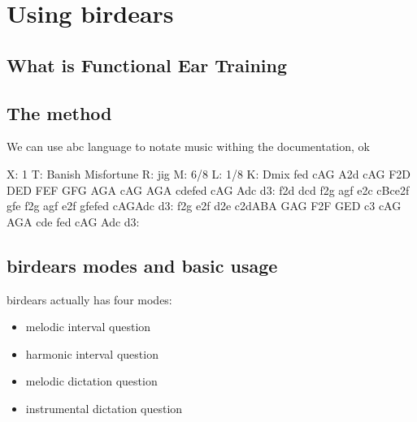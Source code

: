 \documentclass[letterpaper,10pt,english]{sphinxmanual}
\begin{document}
\chapter{Using birdears}
\label{\detokenize{using:using-birdears}}\label{\detokenize{using::doc}}

\section{What is Functional Ear Training}
\label{\detokenize{using:what-is-functional-ear-training}}


\section{The method}
\label{\detokenize{using:the-method}}
We can use abc language to notate music withing the documentation, ok

%
\begin{sphinxVerbatim}[commandchars=\\\{\}]
X: 1
T: Banish Misfortune
R: jig
M: 6/8
L: 1/8
K: Dmix
fed cAG\textbar{} A2d cAG\textbar{} F2D DED\textbar{} FEF GFG\textbar{}
AGA cAG\textbar{} AGA cde\textbar{}fed cAG\textbar{} Ad\PYGZca{}c d3:\textbar{}
f2d d\PYGZca{}cd\textbar{} f2g agf\textbar{} e2c cBc\textbar{}e2f gfe\textbar{}
f2g agf\textbar{} e2f gfe\textbar{}fed cAG\textbar{}Ad\PYGZca{}c d3:\textbar{}
f2g e2f\textbar{} d2e c2d\textbar{}ABA GAG\textbar{} F2F GED\textbar{}
c3 cAG\textbar{} AGA cde\textbar{} fed cAG\textbar{} Ad\PYGZca{}c d3:\textbar{}
\end{sphinxVerbatim}


\section{birdears modes and basic usage}
\label{\detokenize{using:birdears-modes-and-basic-usage}}
birdears actually has four modes:
\begin{itemize}
\item {} 
melodic interval question

\item {} 
harmonic interval question

\item {} 
melodic dictation question

\item {} 
instrumental dictation question

\end{itemize}
\end{document}
